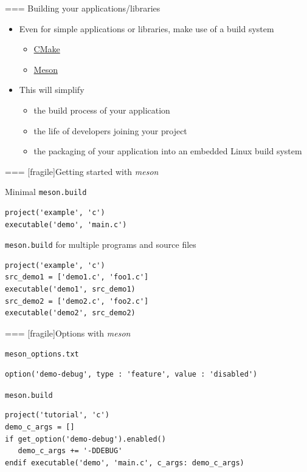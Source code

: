=== {Building your applications/libraries}
  \begin{itemize}
  \item Even for simple applications or libraries, make use of a build
    system
    \begin{itemize}
    \item \href{https://cmake.org/}{CMake}
    \item \href{https://mesonbuild.com/}{Meson}
    \end{itemize}
  \item This will simplify
    \begin{itemize}
    \item the build process of your application
    \item the life of developers joining your project
    \item the packaging of your application into an embedded Linux
      build system
    \end{itemize}
  \end{itemize}


=== [fragile]{Getting started with {\em meson}}
  \begin{block}{Minimal {\tt meson.build}}
\begin{verbatim}
project('example', 'c')
executable('demo', 'main.c')
\end{verbatim}
  \end{block}

  \begin{block}{{\tt meson.build} for multiple programs and source files}
\begin{verbatim}
project('example', 'c')
src_demo1 = ['demo1.c', 'foo1.c']
executable('demo1', src_demo1)
src_demo2 = ['demo2.c', 'foo2.c']
executable('demo2', src_demo2)
\end{verbatim}
  \end{block}


=== [fragile]{Options with {\em meson}}
  \begin{block}{{\tt meson\_options.txt}}
\begin{verbatim}
option('demo-debug', type : 'feature', value : 'disabled')
\end{verbatim}
  \end{block}

  \begin{block}{{\tt meson.build}}
\begin{verbatim}
project('tutorial', 'c')
demo_c_args = []
if get_option('demo-debug').enabled()
   demo_c_args += '-DDEBUG'
endif executable('demo', 'main.c', c_args: demo_c_args)
\end{verbatim}
  \end{block}


